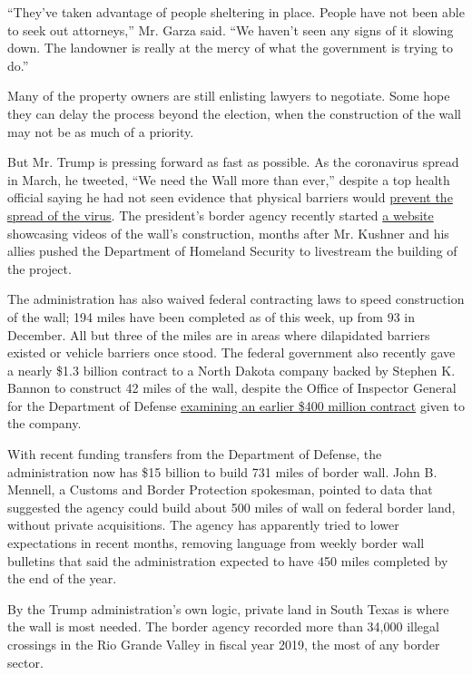 ``They've taken advantage of people sheltering in place. People have not
been able to seek out attorneys,'' Mr. Garza said. ``We haven't seen any
signs of it slowing down. The landowner is really at the mercy of what
the government is trying to do.''

Many of the property owners are still enlisting lawyers to negotiate.
Some hope they can delay the process beyond the election, when the
construction of the wall may not be as much of a priority.

But Mr. Trump is pressing forward as fast as possible. As the
coronavirus spread in March, he tweeted, ``We need the Wall more than
ever,'' despite a top health official saying he had not seen evidence
that physical barriers would
\href{https://www.politico.com/news/2020/03/10/cdc-director-border-wall-coronavirus-125007}{prevent
the spread of the virus}. The president's border agency recently started
\href{https://www.cbp.gov/border-security/along-us-borders/border-wall-system}{a
website} showcasing videos of the wall's construction, months after Mr.
Kushner and his allies pushed the Department of Homeland Security to
livestream the building of the project.

The administration has also waived federal contracting laws to speed
construction of the wall; 194 miles have been completed as of this week,
up from 93 in December. All but three of the miles are in areas where
dilapidated barriers existed or vehicle barriers once stood. The federal
government also recently gave a nearly \$1.3 billion contract to a North
Dakota company backed by Stephen K. Bannon to construct 42 miles of the
wall, despite the Office of Inspector General for the Department of
Defense
\href{https://www.nytimes3xbfgragh.onion/2019/12/12/us/politics/trump-border-wall-investigation.html}{examining
an earlier \$400 million contract} given to the company.

With recent funding transfers from the Department of Defense, the
administration now has \$15 billion to build 731 miles of border wall.
John B. Mennell, a Customs and Border Protection spokesman, pointed to
data that suggested the agency could build about 500 miles of wall on
federal border land, without private acquisitions. The agency has
apparently tried to lower expectations in recent months, removing
language from weekly border wall bulletins that said the administration
expected to have 450 miles completed by the end of the year.

By the Trump administration's own logic, private land in South Texas is
where the wall is most needed. The border agency recorded more than
34,000 illegal crossings in the Rio Grande Valley in fiscal year 2019,
the most of any border sector.

